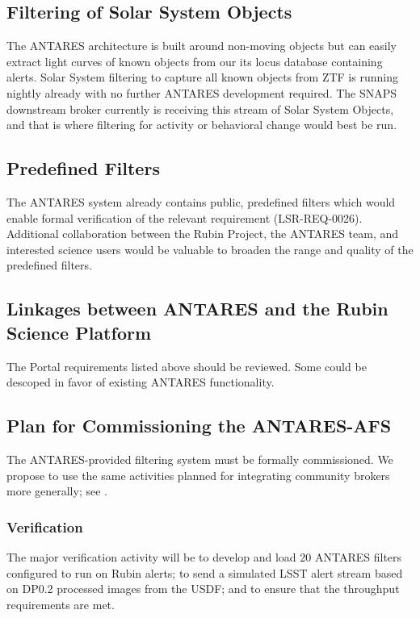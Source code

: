 \documentclass[DM,authoryear,toc]{lsstdoc}
\begin{document}
\subsection{Filtering of Solar System Objects}

The ANTARES architecture is built around non-moving objects but can easily extract light curves of known objects from our its locus database containing alerts. 
Solar System filtering to capture all known objects from ZTF is running nightly already with no further ANTARES development required. 
The SNAPS downstream broker currently is receiving this stream of Solar System Objects, and that is where filtering for activity or behavioral change would best be run.
\subsection{Predefined Filters}

The ANTARES system already contains public, predefined filters which would enable formal verification of the relevant requirement (LSR-REQ-0026).
Additional collaboration between the Rubin Project, the ANTARES team, and interested science users would be valuable to broaden the range and quality of the predefined filters.

\subsection{Linkages between ANTARES and the Rubin Science Platform}

The  Portal requirements listed above should be reviewed.
Some could be descoped in favor of existing ANTARES functionality.

\subsection{Plan for Commissioning the ANTARES-AFS}

The ANTARES-provided filtering system must be formally commissioned.  
We propose to use the same activities planned for integrating community brokers more generally; see .

\subsubsection{Verification}

The major verification activity will be to develop and load 20 ANTARES filters configured to run on Rubin alerts; to send a simulated LSST alert stream based on DP0.2 processed images from the USDF; and to ensure that the throughput requirements are met.  
\end{document}
